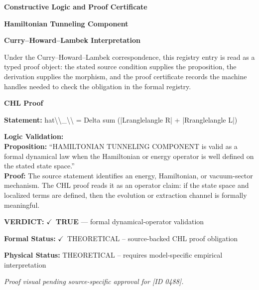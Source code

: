 \clearpage
\begingroup\tzpsupportsetup
\noindent\textbf{\fontsize{10.8pt}{12.8pt}\selectfont [ID 0488] Constructive Logic and Proof Certificate}\par
\noindent\textbf{\fontsize{10pt}{12pt}\selectfont Hamiltonian Tunneling Component}\par
\vspace{0.45em}
\begingroup
\footnotesize
\setlength{\parskip}{0.22em}
\setlength{\parindent}{0pt}
\noindent\textbf{Curry--Howard--Lambek Interpretation}\par
Under the Curry--Howard--Lambek correspondence, this registry entry is read as a typed proof
object: the stated source condition supplies the proposition, the derivation supplies the
morphism, and the proof certificate records the machine handles needed to check the obligation
in the formal registry.

\vspace{0.45em}
\noindent\textbf{CHL Proof}\par
\textbf{Statement:} hat\textbackslash{}\textbackslash{}\_\textbackslash{}\textbackslash{} = Delta sum (|Lranglelangle R| + |Rranglelangle L|)

\textbf{Logic Validation:}\\
\textbf{Proposition:} ``HAMILTONIAN TUNNELING COMPONENT is valid as a formal dynamical law when the Hamiltonian
or energy operator is well defined on the stated state space.''\\
\textbf{Proof:} The source statement identifies an energy, Hamiltonian, or vacuum-sector mechanism. The
CHL proof reads it as an operator claim: if the state space and localized terms are
defined, then the evolution or extraction channel is formally meaningful.

\textbf{VERDICT:} \ensuremath{\checkmark}\ \textbf{TRUE} --- formal dynamical-operator validation

\textbf{Formal Status:} \ensuremath{\checkmark}\ THEORETICAL -- source-backed CHL proof obligation

\textbf{Physical Status:} THEORETICAL -- requires model-specific empirical interpretation
\par\vspace{0.45em}
\par
\vfill
\begingroup\footnotesize\itshape
Proof visual pending source-specific approval for [ID 0488].
\par\endgroup
\vfill
\endgroup
\endgroup
